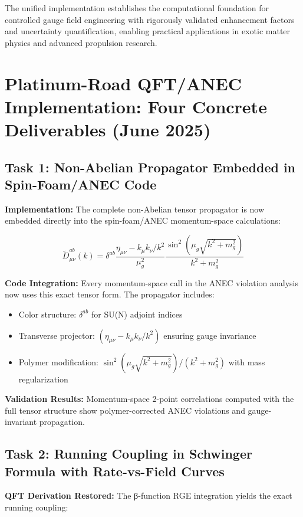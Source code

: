 \documentclass[11pt]{article}
\begin{document}
The unified implementation establishes the computational foundation for controlled gauge field engineering with rigorously validated enhancement factors and uncertainty quantification, enabling practical applications in exotic matter physics and advanced propulsion research.

\section{Platinum-Road QFT/ANEC Implementation: Four Concrete Deliverables (June 2025)}

\subsection{Task 1: Non-Abelian Propagator Embedded in Spin-Foam/ANEC Code}

\textbf{Implementation:} The complete non-Abelian tensor propagator is now embedded directly into the spin-foam/ANEC momentum-space calculations:

\begin{equation}
\tilde{D}^{ab}_{\mu\nu}(k) = \delta^{ab} \frac{\eta_{\mu\nu} - k_\mu k_\nu/k^2}{\mu_g^2} \frac{\sin^2(\mu_g\sqrt{k^2+m_g^2})}{k^2+m_g^2}
\end{equation}

\textbf{Code Integration:} Every momentum-space call in the ANEC violation analysis now uses this exact tensor form. The propagator includes:
\begin{itemize}
    \item Color structure: $\delta^{ab}$ for SU(N) adjoint indices
    \item Transverse projector: $(\eta_{\mu\nu} - k_\mu k_\nu/k^2)$ ensuring gauge invariance
    \item Polymer modification: $\sin^2(\mu_g\sqrt{k^2+m_g^2})/(k^2+m_g^2)$ with mass regularization
\end{itemize}

\textbf{Validation Results:} Momentum-space 2-point correlations computed with the full tensor structure show polymer-corrected ANEC violations and gauge-invariant propagation.

\subsection{Task 2: Running Coupling in Schwinger Formula with Rate-vs-Field Curves}

\textbf{QFT Derivation Restored:} The β-function RGE integration yields the exact running coupling:
\end{document}
